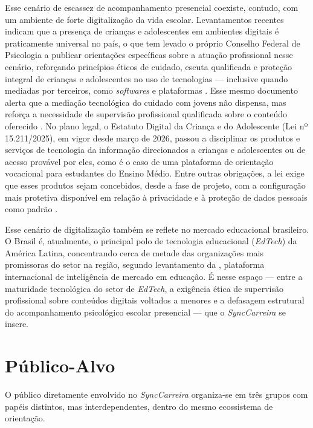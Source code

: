 Esse cenário de escassez de acompanhamento presencial coexiste, contudo, com um ambiente de forte digitalização da vida escolar. Levantamentos recentes indicam que a presença de crianças e adolescentes em ambientes digitais é praticamente universal no país, o que tem levado o próprio Conselho Federal de Psicologia a publicar orientações específicas sobre a atuação profissional nesse cenário, reforçando princípios éticos de cuidado, escuta qualificada e proteção integral de crianças e adolescentes no uso de tecnologias --- inclusive quando mediadas por terceiros, como \textit{softwares} e plataformas \cite{cfp2025mundodigital}. Esse mesmo documento alerta que a mediação tecnológica do cuidado com jovens não dispensa, mas reforça a necessidade de supervisão profissional qualificada sobre o conteúdo oferecido \cite{cfp2025mundodigital}. No plano legal, o Estatuto Digital da Criança e do Adolescente (Lei nº 15.211/2025), em vigor desde março de 2026, passou a disciplinar os produtos e serviços de tecnologia da informação direcionados a crianças e adolescentes ou de acesso provável por eles, como é o caso de uma plataforma de orientação vocacional para estudantes do Ensino Médio. Entre outras obrigações, a lei exige que esses produtos sejam concebidos, desde a fase de projeto, com a configuração mais protetiva disponível em relação à privacidade e à proteção de dados pessoais como padrão \cite{brasil2025lei15211}.

Esse cenário de digitalização também se reflete no mercado educacional brasileiro. O Brasil é, atualmente, o principal polo de tecnologia educacional (\textit{EdTech}) da América Latina, concentrando cerca de metade das organizações mais promissoras do setor na região, segundo levantamento da , plataforma internacional de inteligência de mercado em educação. É nesse espaço --- entre a maturidade tecnológica do setor de \textit{EdTech}, a exigência ética de supervisão profissional sobre conteúdos digitais voltados a menores e a defasagem estrutural do acompanhamento psicológico escolar presencial --- que o \textit{SyncCarreira} se insere.

\section{Público-Alvo}\label{sec:publico-alvo}

O público diretamente envolvido no \textit{SyncCarreira} organiza-se em três grupos com papéis distintos, mas interdependentes, dentro do mesmo ecossistema de orientação.

